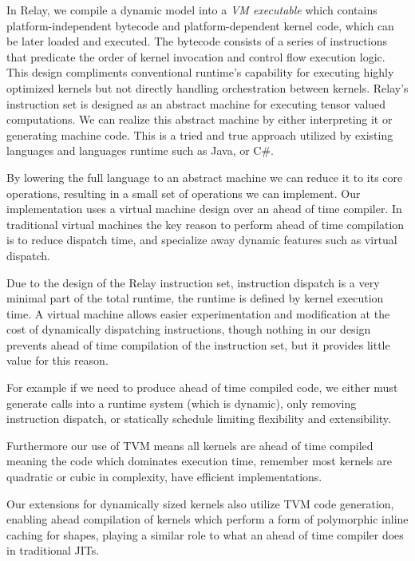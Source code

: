 In Relay, we compile a dynamic model into a {\em VM executable} which contains
  platform-independent bytecode and platform-dependent kernel code, which can be later loaded and executed.
The bytecode consists of a series of instructions that predicate the order of kernel invocation and control flow execution logic.
This design compliments conventional runtime's capability for executing highly optimized kernels but not directly handling orchestration between kernels.
Relay's instruction set is designed as an abstract machine for executing tensor valued
computations. We can realize this abstract machine by either interpreting it or generating
machine code. This is a tried and true approach utilized by existing languages and languages
runtime such as Java, or C\#.

By lowering the full language to an abstract machine we can reduce it to its core operations,
resulting in a small set of operations we can implement. Our implementation uses a virtual
machine design over an ahead of time compiler. In traditional virtual machines the key
reason to perform ahead of time compilation is to reduce dispatch time, and specialize
away dynamic features such as virtual dispatch.

Due to the design of the Relay instruction set, instruction dispatch is a very minimal
part of the total runtime, the runtime is defined by kernel execution time.
A virtual machine allows easier experimentation and modification at the cost of dynamically
dispatching instructions, though nothing in our design prevents ahead of time compilation
of the instruction set, but it provides little value for this reason.

For example if we need to produce ahead of time
compiled code, we either must generate calls into a runtime system (which is dynamic),
only removing instruction dispatch, or statically schedule limiting flexibility and
extensibility.

Furthermore our use of TVM means all kernels are ahead of time compiled meaning the
code which dominates execution time, remember most kernels are quadratic or cubic in
complexity, have efficient implementations.

Our extensions for dynamically sized kernels also utilize TVM code generation, enabling
ahead compilation of kernels which perform a form of polymorphic inline caching for shapes,
playing a similar role to what an ahead of time compiler does in traditional JITs.

